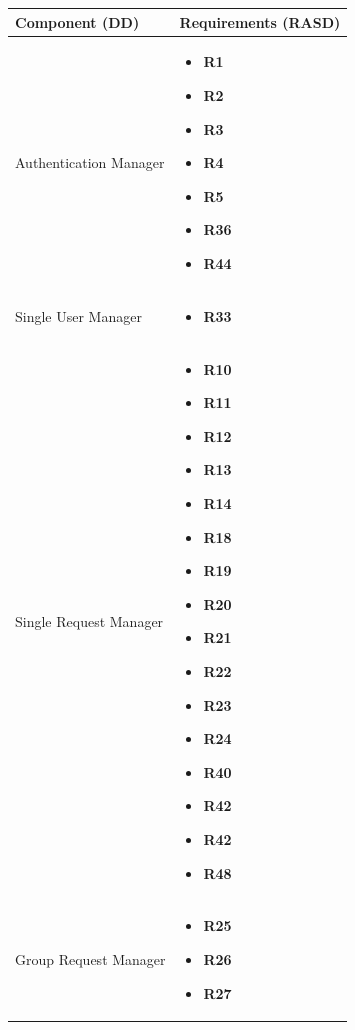 \documentclass[titlepage]{article}
\begin{document}
\begin{longtable}{ p{5 cm} | p{8 cm} } \hline
		Component (DD) & Requirements (RASD)  \\ \hline
		\newline Authentication Manager & 
		\begin{itemize}
			\item {\bf R1} 
			\item {\bf R2} 
			\item {\bf R3} 
			\item {\bf R4} 
			\item {\bf R5} 
			\item {\bf R36} 
			\item {\bf R44} 
		\end{itemize}		\\ \hline
		\newline Single User Manager & 
		\begin{itemize}
			\item {\bf R33} 
		\end{itemize}		
		\\	 \hline	
		\newline Single Request Manager & 
		\begin{itemize}
			\item {\bf R10} 
			\item {\bf R11} 
			\item {\bf R12} 
			\item {\bf R13} 
			\item {\bf R14} 
			\item {\bf R18} 
			\item {\bf R19} 
			\item {\bf R20} 
			\item {\bf R21} 
			\item {\bf R22} 
			\item {\bf R23} 
			\item {\bf R24} 
			\item {\bf R40} 
			\item {\bf R42} 
			\item {\bf R42} 
			\item {\bf R48} 
		\end{itemize}		
		\\	 \hline	
		\newline Group Request Manager & 
		\begin{itemize}
			\item {\bf R25} 
			\item {\bf R26} 
			\item {\bf R27} 

\end{itemize}
\end{longtable}
\end{document}
